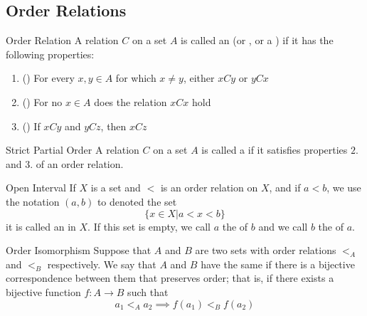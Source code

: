 \documentclass[12pt, a4paper, twoside, openright, titlepage]{book}
\begin{document}
\begin{appendices}
    \subsection{Order Relations}

    \begin{defn}{Order Relation}
        A relation $C$ on a set $A$ is called an  (or , or a ) if it has the following properties: \begin{enumerate}
            \item () For every $x,y \in A$ for which $x \neq y$, either $xCy$ or $yCx$
            \item () For no $x \in A$ does the relation $xCx$ hold
            \item () If $xCy$ and $yCz$, then $xCz$
        \end{enumerate}
    \end{defn}

    \begin{defn}{Strict Partial Order}{}
        A relation $C$ on a set $A$ is called a  if it satisfies properties $2.$ and $3.$ of an order relation.
    \end{defn}

    
    \begin{defn}{Open Interval}{}
        If $X$ is a set and $<$ is an order relation on $X$, and if $a < b$, we use the notation $(a,b)$ to denoted the set \begin{equation*}
            \{x \in X\vert a < x < b\}
        \end{equation*}
        it is called an  in $X$. If this set is empty, we call $a$ the  of $b$ and we call $b$ the  of $a$.
    \end{defn}

    \begin{defn}{Order Isomorphism}{}
        Suppose that $A$ and $B$ are two sets with order relations $<_A$ and $<_B$ respectively. We say that $A$ and $B$ have the same  if there is a bijective correspondence between them that preserves order; that is, if there exists a bijective function $f:A\rightarrow B$ such that \begin{equation*}
            a_1 <_A a_2 \implies f(a_1) <_B f(a_2)
        \end{equation*}
    \end{defn}


\end{appendices}
\end{document}
